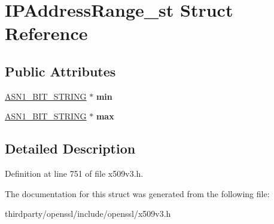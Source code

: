 \hypertarget{struct_i_p_address_range__st}{}\section{I\+P\+Address\+Range\+\_\+st Struct Reference}
\label{struct_i_p_address_range__st}
\subsection*{Public Attributes}
\begin{DoxyCompactItemize}
\item 
\mbox{\label{struct_i_p_address_range__st_a5a60ca0834f68ec801f037ba4cb22651}} 
\hyperlink{structasn1__string__st}{A\+S\+N1\+\_\+\+B\+I\+T\+\_\+\+S\+T\+R\+I\+NG} $\ast$ {\bfseries min}
\item 
\mbox{\label{struct_i_p_address_range__st_a501c4fffd9d31b1990d81895c803bc6a}} 
\hyperlink{structasn1__string__st}{A\+S\+N1\+\_\+\+B\+I\+T\+\_\+\+S\+T\+R\+I\+NG} $\ast$ {\bfseries max}
\end{DoxyCompactItemize}


\subsection{Detailed Description}


Definition at line 751 of file x509v3.\+h.



The documentation for this struct was generated from the following file\+:\begin{DoxyCompactItemize}
\item 
thirdparty/openssl/include/openssl/x509v3.\+h\end{DoxyCompactItemize}

